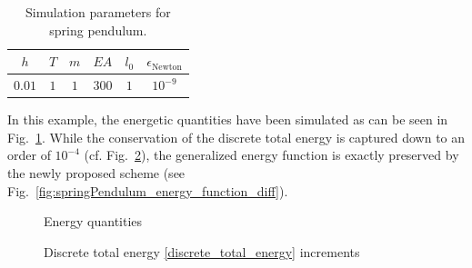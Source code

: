 \documentclass{multibody2023_full_paper}
\newlength\figH
\newlength\figW
\begin{document}
\begin{table}[tb]
    \begin{center}
        \caption{Simulation parameters for spring pendulum.}
        \vspace{1mm}
        \begin{tabular}{*{6}{|c}|}
            \hline
            $h$    & $T$ & $m$ & $EA$  & $l_{0}$ & $\epsilon_\mathrm{Newton}$ \\
            \hline
            $0.01$ & $1$ & $1$ & $300$ & $1$     & $10^{-9}$                  \\
            \hline
        \end{tabular}
        \label{tab:tab2}
    \end{center}
\end{table}

In this example, the energetic quantities have been simulated as can be seen in Fig.~\ref{fig:springPendulum_energy}. While the conservation of the discrete total energy is captured down to an order of $10^{-4}$ (cf. Fig.~\ref{fig:springPendulum_total_energy_diff}), the generalized energy function is exactly preserved by the newly proposed scheme (see Fig.~\ref{fig:springPendulum_energy_function_diff}).


\begin{figure}[htb]
    \centering
    \setlength{\figH}{0.18\textheight}
    \setlength{\figW}{0.6\textwidth}
    
    \caption{Energy quantities}
    \label{fig:springPendulum_energy}
\end{figure}

\begin{figure}[htb]
    \centering
    \hspace*{-10mm}
    \setlength{\figH}{0.18\textheight}
    \setlength{\figW}{0.6\textwidth}
    
    \caption{Discrete total energy \eqref{discrete_total_energy} increments}
    \label{fig:springPendulum_total_energy_diff}
\end{figure}
\end{document}
